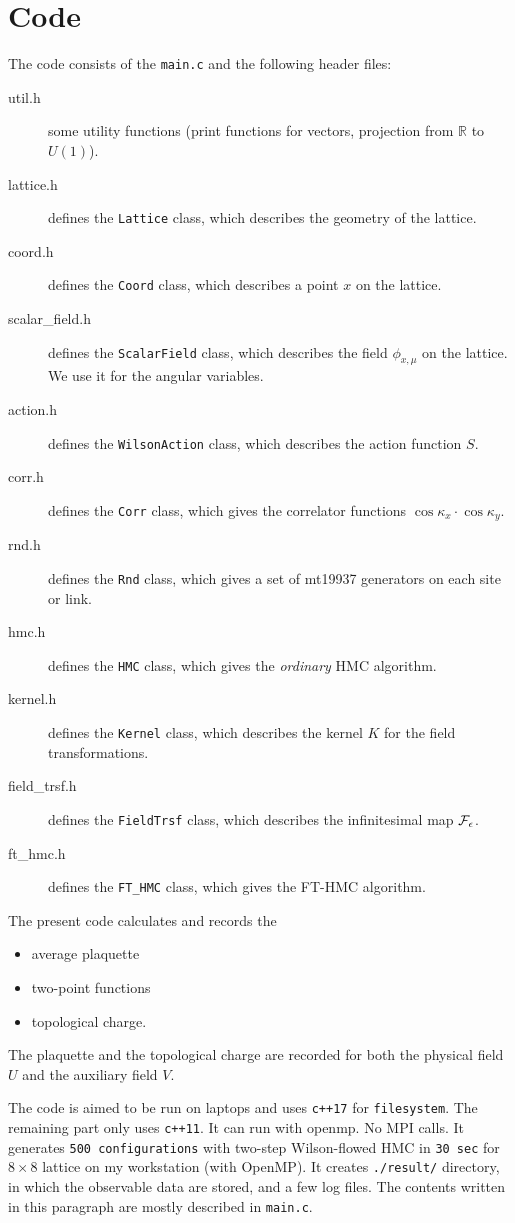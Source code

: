 \documentclass[12pt]{article}
\begin{document}
\section{Code}
\label{sec:code}

The code consists of the {\tt main.c} and the following
header files:
\begin{description}
\item[util.h] some utility functions (print functions for vectors, projection from $\mathbb{R}$ to $U(1)$).
\item[lattice.h] defines the {\tt Lattice} class, which describes the geometry of the lattice.
\item[coord.h] defines the {\tt Coord} class, which describes a point $x$ on the lattice.
\item[scalar\_field.h] defines the {\tt ScalarField} class, which describes the field $\phi_{x,\mu}$ on the lattice. We use it for the angular variables.
\item[action.h] defines the {\tt WilsonAction} class, which describes the action function $S$.
\item[corr.h] defines the {\tt Corr} class, which gives the correlator functions $\cos\kappa_x\cdot\cos\kappa_y$.
\item[rnd.h] defines the {\tt Rnd} class, which gives a set of mt19937 generators on each site or link.
\item[hmc.h] defines the {\tt HMC} class, which gives the {\it ordinary} HMC algorithm.
\item[kernel.h] defines the {\tt Kernel} class, which describes the kernel $K$ for the field transformations.
\item[field\_trsf.h] defines the {\tt FieldTrsf} class, which describes the infinitesimal map $\cal{F}_\epsilon$.
\item[ft\_hmc.h] defines the {\tt FT\_HMC} class, which gives the FT-HMC algorithm.
\end{description}

The present code calculates and records the
\begin{itemize}
\item average plaquette
\item two-point functions
\item topological charge.
\end{itemize}
The plaquette and the topological charge are recorded for both the physical field $U$ and the auxiliary field $V$.

The code is aimed to be run on laptops and uses {\tt c++17} for {\tt filesystem}.
The remaining part only uses {\tt c++11}.
It can run with openmp. No MPI calls.
It generates {\tt 500 configurations} with two-step Wilson-flowed HMC in {\tt 30 sec} for $8\times 8$ lattice on my workstation (with OpenMP).
It creates {\tt ./result/} directory, in which the observable data are stored, and a few log files.
The contents written in this paragraph are mostly described in {\tt main.c}.
\end{document}
